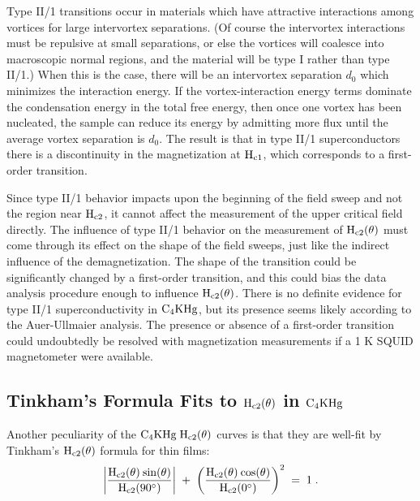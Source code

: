 	Type II/1   transitions occur in   materials which  have  attractive
interactions among vortices for large intervortex separations.   (Of course
the intervortex  interactions must be  repulsive at  small  separations, or
else the vortices will  coalesce  into macroscopic normal  regions, and the
material will be  type I rather than  type  II/1.)  When this  is the case,
there  will  be  an intervortex  separation  $d_0$  which    minimizes  the
interaction  energy.  If the vortex-interaction energy terms  dominate the
condensation energy in  the total free  energy, then once one vortex
has been nucleated, the sample can reduce its energy by admitting more flux
until the average vortex separation is  $d_0$.   The result is that in type
II/1 superconductors there is a discontinuity  in the magnetization at $\rm
H_{c1}$, which corresponds to a first-order transition.\cite{auer73}

	 Since type II/1 behavior  impacts upon the  beginning of the field
sweep and    not  the region  near   $\rm H_{c2}$,  it  cannot   affect the
measurement of  the  upper critical  field directly.  The influence of type
II/1 behavior on the measurement of $\rm  H_{c2}(\theta)$ must come through
its effect  on the shape   of  the field sweeps,  just  like  the  indirect
influence of  the demagnetization.  The  shape  of the transition  could be
significantly changed by a first-order transition,  and this could bias the
data analysis procedure enough to influence $\rm H_{c2}(\theta)$.  There is
no definite evidence for  type II/1 superconductivity  in $\rm C_4KHg$, but
its  presence      seems  likely      according  to     the   Auer-Ullmaier
analysis.\cite{auer73} The presence or absence  of a first-order transition
could undoubtedly be resolved  with  magnetization measurements   if a  1 K
SQUID magnetometer were available.

\subsection{Tinkham's Formula Fits to $\rm H_{c2}(\theta)$ in $\rm C_4KHg $}
\label{sec:tf}

	Another peculiarity of the $\rm  C_4KHg \; H_{c2}(\theta) $  curves
is that they  are well-fit  by Tinkham's  $\rm H_{c2}(\theta)$ formula  for
thin films:\cite{tinkham63}\\

\begin{equation}
\label{tinkham}
\rm \left| \frac{H_{c2}(\theta) \: sin(\theta)}{H_{c2}(90^{\circ})} \right| \; + \;
\left( \frac{H_{c2}(\theta) \: cos(\theta)}{H_{c2}(0^{\circ})} \right)^2 \;
= \; 1 \; .
\end{equation}

